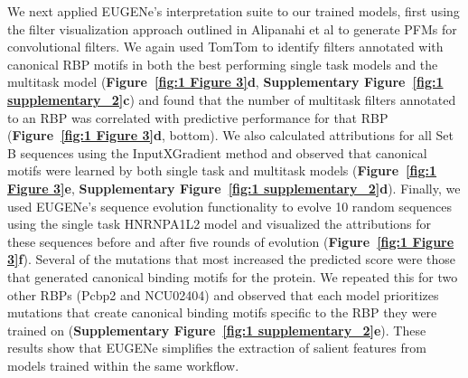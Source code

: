 We next applied EUGENe’s interpretation suite to our trained models, first using the filter visualization approach outlined in Alipanahi et al to generate PFMs for convolutional filters. We again used TomTom to identify filters annotated with canonical RBP motifs\cite{Ray2013-yd} in both the best performing single task models and the multitask model (\textbf{Figure~\ref{fig:1 Figure 3}d}, \textbf{Supplementary Figure~\ref{fig:1 supplementary_2}c}) and found that the number of multitask filters annotated to an RBP was correlated with predictive performance for that RBP (\textbf{Figure~\ref{fig:1 Figure 3}d}, bottom). We also calculated attributions for all Set B sequences using the InputXGradient method\cite{Shrikumar2016-lf} and observed that canonical motifs were learned by both single task and multitask models (\textbf{Figure~\ref{fig:1 Figure 3}e}, \textbf{Supplementary Figure~\ref{fig:1 supplementary_2}d}). Finally, we used EUGENe’s sequence evolution functionality to evolve 10 random sequences using the single task HNRNPA1L2 model and visualized the attributions for these sequences before and after five rounds of evolution (\textbf{Figure~\ref{fig:1 Figure 3}f}). Several of the mutations that most increased the predicted score were those that generated canonical binding motifs for the protein. We repeated this for two other RBPs (Pcbp2 and NCU02404) and observed that each model prioritizes mutations that create canonical binding motifs specific to the RBP they were trained on (\textbf{Supplementary Figure~\ref{fig:1 supplementary_2}e}). These results show that EUGENe simplifies the extraction of salient features from models trained within the same workflow.

